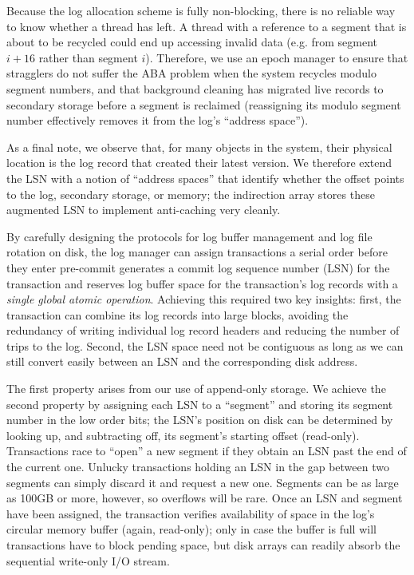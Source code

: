 Because the log allocation scheme is fully non-blocking, there is no reliable way to know whether a thread has left. A thread with a reference to a segment that is about to be recycled could end up accessing invalid data (e.g. from segment $i+16$ rather than segment $i$). Therefore, we use an epoch manager to ensure that stragglers do not suffer the ABA problem when the system recycles modulo segment numbers, and that background cleaning has migrated live records to secondary storage before a segment is reclaimed (reassigning its modulo segment number effectively removes it from the log's ``address space'').

As a final note, we observe that, for many objects in the system, their physical location is the log record that created their latest version. We therefore extend the LSN with a notion of ``address spaces'' that identify whether the offset points to the log, secondary storage, or memory; the indirection array stores these augmented LSN to implement anti-caching very cleanly. 

By carefully designing the protocols for log buffer management and log file rotation on disk, the log manager can assign transactions a serial order before they enter pre-commit generates a commit log sequence number (LSN) for the transaction and reserves log buffer space for the transaction's log records with a \textit{single global atomic operation}. Achieving this required two key insights: first, the transaction can combine its log records into large blocks, avoiding the redundancy of writing individual log record headers and reducing the number of trips to the log. Second, the LSN space need not be contiguous as long as we can still convert easily between an LSN and the corresponding disk address.

The first property arises from our use of append-only storage. We achieve the second property by assigning each LSN to a ``segment'' and storing its segment number in the low order bits; the LSN's position on disk can be determined by looking up, and subtracting off, its segment's starting offset (read-only). Transactions race to ``open'' a new segment if they obtain an LSN past the end of the current one. Unlucky transactions holding an LSN in the gap between two segments can simply discard it and request a new one. Segments can be as large as 100GB or more, however, so overflows will be rare. Once an LSN and segment have been assigned, the transaction verifies availability of space in the log's circular memory buffer (again, read-only); only in case the buffer is full will transactions have to block pending space, but disk arrays can readily absorb the sequential write-only I/O stream.


